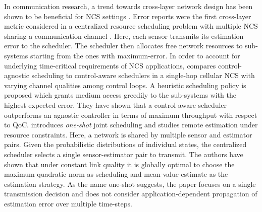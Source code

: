In communication research, a trend towards cross-layer network design has been
shown to be beneficial for NCS settings \cite{park2017wireless}. Error reports
were the first cross-layer metric considered in a centralized resource
scheduling problem with multiple NCS sharing a communication channel
\cite{walsh2001scheduling}. Here, each sensor transmits its estimation error to
the scheduler. The scheduler then allocates free network resources to
sub-systems starting from the ones with maximum-error. In order to account for
underlying time-critical requirements of NCS applications,
\cite{vilgelm2017control} compares control-agnostic scheduling to control-aware
schedulers in a single-hop cellular NCS with varying channel qualities among
control loops. A heuristic scheduling policy is proposed which grants medium
access greedily to the sub-systems with the highest expected error. They have
shown that a control-aware scheduler outperforms an agnostic controller in terms
of maximum throughput with respect to QoC. \cite{vasconcelos2017optimal}
introduces \textit{one-shot} joint scheduling and studies remote estimation
under resource constraints. Here, a network is shared by multiple sensor and
estimator pairs. Given the probabilistic distributions of individual states, the
centralized scheduler selects a single sensor-estimator pair to transmit. The
authors have shown that under constant link quality it is globally optimal to
choose the maximum quadratic norm as scheduling and mean-value estimate as the
estimation strategy. As the name one-shot suggests, the paper focuses on a
single transmission decision and does not consider application-dependent
propagation of estimation error over multiple time-steps.

